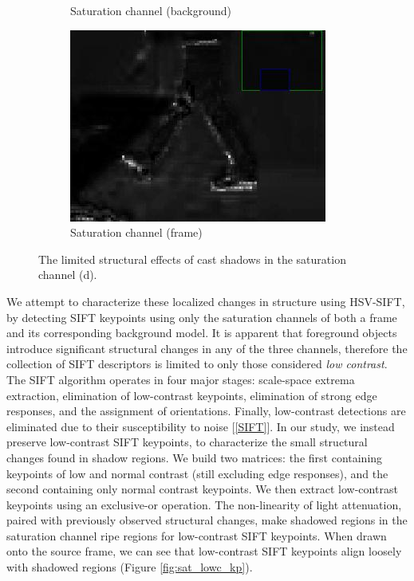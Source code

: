 \begin{figure}
\begin{subfigure}{.49\linewidth}
  \caption{Saturation channel (background)}
\end{subfigure}
\hfill
\begin{subfigure}{.49\linewidth}
  \includegraphics[width=1\linewidth]{figures/lab_sat_fg_zoom_0161.jpg}
  \caption{Saturation channel (frame)}
\end{subfigure}

\caption{The limited structural effects of cast shadows in the saturation channel (d).}
\label{fig:sat_struct}
\end{figure}

We attempt to characterize these localized changes in structure using HSV-SIFT, by detecting SIFT keypoints using only the saturation channels of both a frame and its corresponding background model. It is apparent that foreground objects introduce significant structural changes in any of the three channels,  therefore the collection of SIFT descriptors is limited to only those considered \textit{low contrast}. The SIFT algorithm operates in four major stages: scale-space extrema extraction, elimination of low-contrast keypoints, elimination of strong edge responses, and the assignment of orientations. Finally, low-contrast detections are eliminated due to their susceptibility to noise [\ref{SIFT}]. In our study, we instead preserve low-contrast SIFT keypoints, to characterize the small structural changes found in shadow regions. We build two matrices: the first containing keypoints of low and normal contrast (still excluding edge responses), and the second containing only normal contrast keypoints. We then extract low-contrast keypoints using an exclusive-or operation. The non-linearity of light attenuation, paired with previously observed structural changes, make shadowed regions in the saturation channel ripe regions for low-contrast SIFT keypoints. When drawn onto the source frame, we can see that low-contrast SIFT keypoints align loosely with shadowed regions (Figure \ref{fig:sat_lowc_kp}). 

